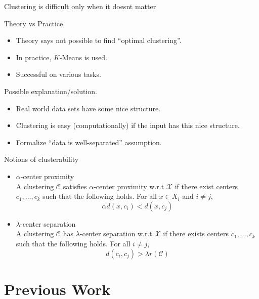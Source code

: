 \documentclass{beamer}
\newcommand{\mc}{\mathcal}
\begin{document}
\begin{frame}{Clustering is difficult only when it doesnt matter}
  
  Theory vs Practice
  \begin{itemize}
	\item Theory says not possible to find ``optimal clustering''.
  	\item In practice, $K$-Means is used.
  	\item Successful on various tasks.
  \end{itemize}
  
  \vspace{0.2in}Possible explanation/solution.
  \begin{itemize}  
  	\item Real world data sets have some nice structure.
  	\item Clustering is easy (computationally) if the input has this nice structure. 
  	\item Formalize ``data is well-separated'' assumption.
  \end{itemize}
\end{frame}

\begin{frame}{Notions of clusterability}
  \begin{itemize}
  	\item $\alpha$-center proximity\\
    A clustering $\mc C$ satisfies $\alpha$-center proximity w.r.t $\mc X$ if there exist centers $c_1, \ldots, c_k$  such that the following holds. For all $x \in X_i$ and $i\neq j$, $$\alpha d(x, c_i) < d(x, c_j)$$ 
  	\item $\lambda$-center separation\\
  	A clustering $\mc C$ has $\lambda$-center separation w.r.t $\mc X$ if there exists centers $c_1, \ldots, c_k$ such that the following holds. For all $i\neq j$, 
  	$$d(c_i, c_j) > \lambda r(\mc C)$$
  \end{itemize}
\end{frame}

\section{Previous Work}
\end{document}
